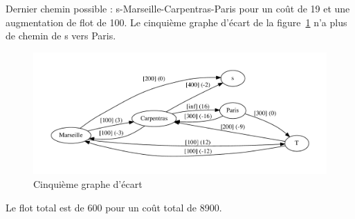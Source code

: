 \documentclass[paper=a4, fontsize=11pt]{scrartcl} %
\numberwithin{equation}{section} %
\numberwithin{figure}{section} %
\numberwithin{table}{section} %
\begin{document}
Dernier chemin possible : s-Marseille-Carpentras-Paris pour un coût de 19 et une augmentation de flot de 100. Le cinquième graphe d'écart de la figure~\ref{fig:fleurs:six} n'a plus de chemin de s vers Paris.

\begin{figure}[h]
\begin{center}
	\includegraphics[width=\textwidth]{fleurs-6.pdf}
	\caption{Cinquième graphe d'écart}
	\label{fig:fleurs:six}
\end{center}
\end{figure}

Le flot total est de 600 pour un coût total de 8900.
\end{document}
